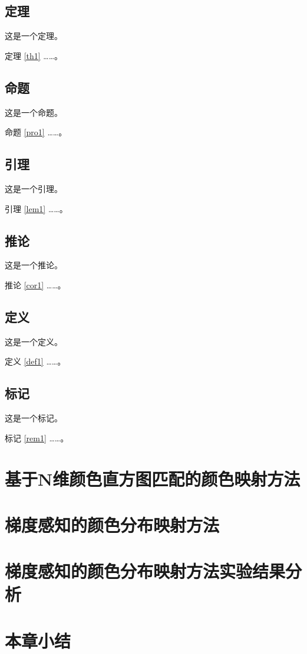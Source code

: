 \subsection{定理}
\begin{theorem}
	这是一个定理。
	\label{th1}
\end{theorem}
定理 \ref{th1} ……。

\subsection{命题}
\begin{proposition}
	这是一个命题。
	\label{pro1}
\end{proposition}
命题 \ref{pro1} ……。

\subsection{引理}
\begin{lemma}
	这是一个引理。
	\label{lem1}
\end{lemma}
引理 \ref{lem1} ……。

\subsection{推论}
\begin{corollary}
	这是一个推论。
	\label{cor1}
\end{corollary}
推论 \ref{cor1} ……。

\subsection{定义}
\begin{definition}
	这是一个定义。
	\label{def1}
\end{definition}
定义 \ref{def1} ……。

\subsection{标记}
\begin{remark}
	这是一个标记。
	\label{rem1}
\end{remark}
标记 \ref{rem1} ……。


\section{基于N维颜色直方图匹配的颜色映射方法}

\section{梯度感知的颜色分布映射方法}

\section{梯度感知的颜色分布映射方法实验结果分析}

\section{本章小结}
